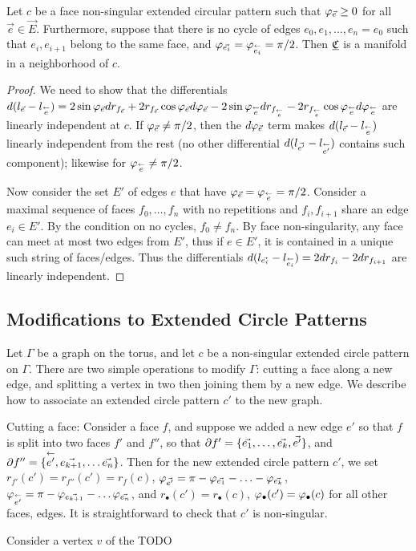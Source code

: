 \begin{lemma}
\label{l:manifold_point}
Let $c$ be a face non-singular extended circular pattern
such that $\varphi_{\vec{e}} \geq 0$ for all $\vec{e}\in\vec{E}$.
Furthermore, suppose that there is no cycle of edges
$e_0, e_1, \ldots, e_n = e_0$ such that
$e_i, e_{i+1}$ belong to the same face,
and $\varphi_{\vec{e_i}} = \varphi_{\overset{\leftarrow}{e_i}} = \pi/2$.
Then ${\underline{\mathfrak{C}}}$ is a manifold in a neighborhood of $c$.
\end{lemma}
\begin{proof}
We need to show that the differentials
$d(l_{\vec{e}} - l_{\overset{\leftarrow}{e}})
= 2\sin \varphi_{\vec{e}} d r_{f_{\vec{e}}}
+ 2r_{f_{\vec{e}}} \cos \varphi_{\vec{e}} d \varphi_{\vec{e}}
- 2\sin \varphi_{\overset{\leftarrow}{e}} d r_{f_{\overset{\leftarrow}{e}}}
- 2r_{f_{\overset{\leftarrow}{e}}} \cos \varphi_{\overset{\leftarrow}{e}} d \varphi_{\overset{\leftarrow}{e}}
$
are linearly independent at $c$.
If $\varphi_{\vec{e}} \neq \pi/2$,
then the $d\varphi_{\vec{e}}$ term makes $d(l_{\vec{e}} - l_{\overset{\leftarrow}{e}})$
linearly independent from the rest
(no other differential $d(l_{\vec{e'}} - l_{\overset{\leftarrow}{e'}})$
contains such component);
likewise for $\varphi_{\overset{\leftarrow}{e}} \neq \pi/2$.


Now consider the set $E'$ of edges $e$ that have
$\varphi_{\vec{e}} = \varphi_{\overset{\leftarrow}{e}} = \pi/2$.
Consider a maximal sequence of faces $f_0,\ldots,f_n$
with no repetitions and $f_i,f_{i+1}$ share
an edge $e_i \in E'$.
By the condition on no cycles,
$f_0 \neq f_n$.
By face non-singularity, any face can meet at most two
edges from $E'$, thus if $e\in E'$,
it is contained in a unique such string of faces/edges.
Thus the differentials
$d(l_{\vec{e_i}} - l_{\overset{\leftarrow}{e_i}}) = 2dr_{f_i} - 2dr_{f_{i+1}}$
are linearly independent.
\end{proof}

\subsection{Modifications to Extended Circle Patterns}


Let $\Gamma$ be a graph on the torus, and let $c$ be a
non-singular extended circle pattern on $\Gamma$.
There are two simple operations to modify $\Gamma$:
cutting a face along a new edge,
and splitting a vertex in two then joining them by a new edge.
We describe how to associate an extended circle pattern $c'$ to
the new graph.


Cutting a face: Consider a face $f$,
and suppose we added a new edge $e'$ so that $f$ is split into
two faces $f'$ and $f''$, so that
$\partial f' = \{\vec{e_1},\ldots,\vec{e_k}, \vec{e'}\}$,
and $\partial f'' = \{\overset{\leftarrow}{e'}, \vec{e_{k+1}},\ldots \vec{e_n}\}$.
Then for the new extended circle pattern $c'$,
we set $r_{f'}(c') = r_{f''}(c') = r_f(c)$,
$\varphi_{\vec{e'}} = \pi - \varphi_{\vec{e_1}} - \ldots - \varphi_{\vec{e_k}}$,
$\varphi_{\overset{\leftarrow}{e'}} = \pi - \varphi_{\vec{e_{k+1}}} - \ldots \varphi_{\vec{e_n}}$,
and $r_\bullet(c') = r_\bullet(c)$, $\varphi_\bullet(c') = \varphi_\bullet(c)$
for all other faces, edges.
It is straightforward to check that $c'$ is non-singular.


Consider a vertex $v$ of the TODO


